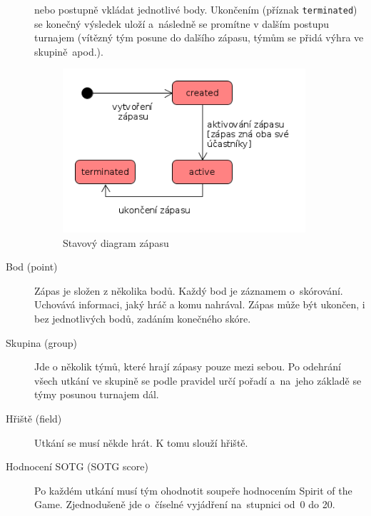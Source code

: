 \begin{description}
    nebo postupně vkládat jednotlivé body. Ukončením (příznak \texttt{terminated}) se konečný výsledek uloží a~následně se promítne
    v dalším postupu turnajem (vítězný tým posune do dalšího zápasu, týmům se přidá výhra ve skupině~apod.).
    \begin{figure}[ht!]
      \centering
      \includegraphics[width=90mm]{./images/stavovy-diagram-zapas.png}
      \caption{Stavový diagram zápasu\label{overflow}}
      \label{fig:state_match}
    \end{figure}
  \item[Bod (point)]
    Zápas je složen z několika bodů. Každý bod je záznamem o~skórování. Uchovává informaci, jaký hráč a komu nahrával.
    Zápas může být ukončen, i bez jednotlivých bodů, zadáním konečného skóre.
  \item[Skupina (group)]
    Jde o několik týmů, které hrají zápasy pouze mezi sebou. Po odehrání všech utkání ve skupině se podle pravidel určí pořadí a~na~jeho základě se týmy posunou turnajem dál.
  \item[Hřiště (field)]
    Utkání se musí někde hrát. K tomu slouží hřiště.
  \item[Hodnocení SOTG (SOTG score)]
    Po každém utkání musí tým ohodnotit soupeře hodnocením Spirit of the Game. Zjednodušeně jde o~číselné vyjádření na~stupnici od~0 do 20.
\end{description}

